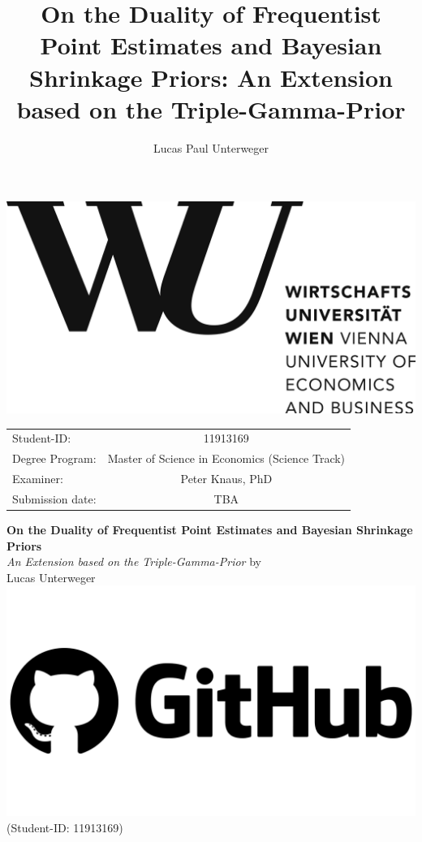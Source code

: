 \documentclass[12pt,a4paper]{article}
\author{Lucas Paul Unterweger}
\title{On the Duality of Frequentist Point Estimates and Bayesian Shrinkage Priors: An Extension based on the Triple-Gamma-Prior}
\begin{document}
\begin{titlepage}
\center
\vfill
\includegraphics[scale=0.1]{WU.png}
\vfill
\begin{tabular}[t]{lc}
Student-ID:  & 11913169 \\
Degree Program: & 
Master of Science in Economics (Science Track) \\
Examiner: & Peter Knaus, PhD \\
Submission date: & TBA \\
\end{tabular}
\vfill
{\large \textbf{On the Duality of Frequentist Point Estimates and Bayesian Shrinkage Priors}\\
\normalsize \textit{An Extension based on the Triple-Gamma-Prior}}
\vfill
by\\ \vspace{3mm}
{\Large Lucas Unterweger \href{https://github.com/therealLucasPaul}{\includegraphics[scale=0.01]{GitHub.png}}}\\
(Student-ID: 11913169)\\
\vfill

\thispagestyle{empty}
\pagebreak
\end{titlepage}
\thispagestyle{empty}
\end{document}
